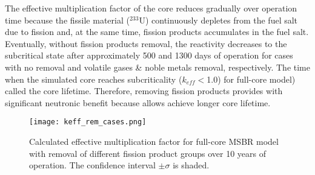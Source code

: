 The effective multiplication factor of the core reduces gradually over 
operation time because the fissile material ($^{233}$U) continuously depletes 
from the fuel salt due to fission and, at the same time, fission products 
accumulates in the fuel salt.	Eventually, without fission products removal, 
the reactivity decreases to the subcritical state after approximately 500 and 
1300 days of operation for cases with no removal and volatile gases \& noble 
metals removal, respectively. The time when the simulated core reaches 
subcriticality ($k_{eff}<$1.0) for full-core model) called the core lifetime. 
Therefore, removing fission products provides with significant neutronic 
benefit because allows achieve longer core lifetime.
\begin{figure}[ht!] %
  \texttt{[image: keff\_rem\_cases.png]} \caption{Calculated 
  effective multiplication factor for full-core \gls{MSBR} model with removal 
  of different fission product groups over 10 years of operation. The 
  confidence interval $\pm\sigma	$ is shaded.}
  \label{fig:fp_removal}
\end{figure}
